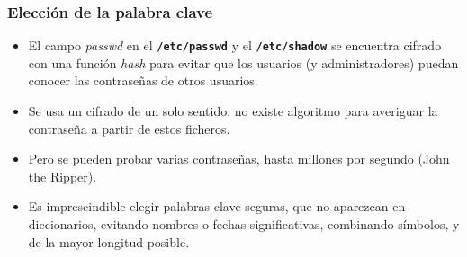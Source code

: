 \documentclass[ucs]{beamer}
\begin{document}
\begin{frame}[fragile]
  \frametitle{Elección de la palabra clave}
  \begin{itemize}
    \item El campo \emph{passwd} en el \texttt{\textbf{/etc/passwd}} y el
      \texttt{\textbf{/etc/shadow}} se encuentra cifrado con una función \emph{hash} para evitar que los usuarios (y administradores) puedan
      conocer las contraseñas de otros usuarios.
    \item Se usa un cifrado de un solo sentido: no existe algoritmo para averiguar la contraseña a partir de estos ficheros.
    \item Pero se pueden probar varias contraseñas, hasta millones por segundo (John the Ripper).
    \item Es imprescindible elegir palabras clave seguras, que no aparezcan en diccionarios, evitando nombres
      o fechas significativas, combinando símbolos, y de la mayor longitud posible.
  \end{itemize}
\end{frame}
\end{document}
